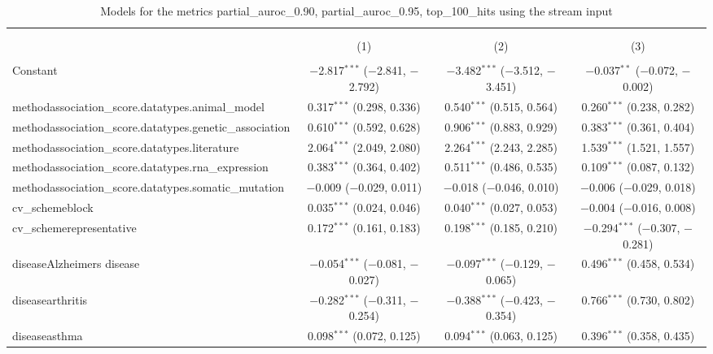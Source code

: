
\begin{table}[!htbp] \centering 
  \caption{Models for the metrics partial_auroc_0.90, partial_auroc_0.95, top_100_hits using the stream input} 
  \label{} 
\begin{tabular}{@{\extracolsep{5pt}}lccc} 
\\[-1.8ex]\hline 
\hline \\[-1.8ex] 
\\[-1.8ex] & (1) & (2) & (3)\\ 
\hline \\[-1.8ex] 
 Constant & $-$2.817$^{***}$ ($-$2.841, $-$2.792) & $-$3.482$^{***}$ ($-$3.512, $-$3.451) & $-$0.037$^{**}$ ($-$0.072, $-$0.002) \\ 
  methodassociation\_score.datatypes.animal\_model & 0.317$^{***}$ (0.298, 0.336) & 0.540$^{***}$ (0.515, 0.564) & 0.260$^{***}$ (0.238, 0.282) \\ 
  methodassociation\_score.datatypes.genetic\_association & 0.610$^{***}$ (0.592, 0.628) & 0.906$^{***}$ (0.883, 0.929) & 0.383$^{***}$ (0.361, 0.404) \\ 
  methodassociation\_score.datatypes.literature & 2.064$^{***}$ (2.049, 2.080) & 2.264$^{***}$ (2.243, 2.285) & 1.539$^{***}$ (1.521, 1.557) \\ 
  methodassociation\_score.datatypes.rna\_expression & 0.383$^{***}$ (0.364, 0.402) & 0.511$^{***}$ (0.486, 0.535) & 0.109$^{***}$ (0.087, 0.132) \\ 
  methodassociation\_score.datatypes.somatic\_mutation & $-$0.009 ($-$0.029, 0.011) & $-$0.018 ($-$0.046, 0.010) & $-$0.006 ($-$0.029, 0.018) \\ 
  cv\_schemeblock & 0.035$^{***}$ (0.024, 0.046) & 0.040$^{***}$ (0.027, 0.053) & $-$0.004 ($-$0.016, 0.008) \\ 
  cv\_schemerepresentative & 0.172$^{***}$ (0.161, 0.183) & 0.198$^{***}$ (0.185, 0.210) & $-$0.294$^{***}$ ($-$0.307, $-$0.281) \\ 
  diseaseAlzheimers disease & $-$0.054$^{***}$ ($-$0.081, $-$0.027) & $-$0.097$^{***}$ ($-$0.129, $-$0.065) & 0.496$^{***}$ (0.458, 0.534) \\ 
  diseasearthritis & $-$0.282$^{***}$ ($-$0.311, $-$0.254) & $-$0.388$^{***}$ ($-$0.423, $-$0.354) & 0.766$^{***}$ (0.730, 0.802) \\ 
  diseaseasthma & 0.098$^{***}$ (0.072, 0.125) & 0.094$^{***}$ (0.063, 0.125) & 0.396$^{***}$ (0.358, 0.435) \\ 

\end{tabular}
\end{table}
